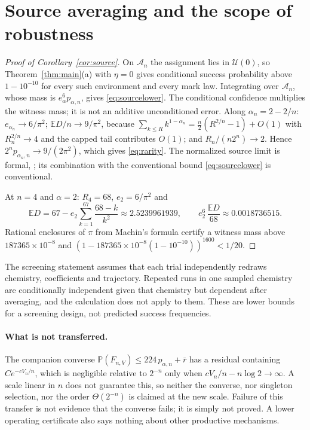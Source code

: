 \documentclass[11pt,letterpaper]{article}
\theoremstyle{plain}
\theoremstyle{definition}
\theoremstyle{remark}
\numberwithin{equation}{section}
\newcommand{\PP}{\mathbb P}
\newcommand{\EE}{\mathbb E}
\newcommand{\cU}{\mathcal U}
\begin{document}
\section{Source averaging and the scope of robustness}\label{sec:source}

\begin{proof}[Proof of Corollary~\ref{cor:source}]
On $\mathcal A_n$ the assignment lies in $\cU(0)$, so Theorem~\ref{thm:main}(a) with $\eta=0$ gives conditional success probability above $1-10^{-10}$ for every such environment and every mark law. Integrating over $\mathcal A_n$, whose mass is $e_\alpha^6p_{\alpha,n}$, gives \eqref{eq:sourcelower}. The conditional confidence multiplies the witness mass; it is not an additive unconditioned error. Along $\alpha_n=2-2/n$: $e_{\alpha_n}\to6/\pi^2$; $\EE D/n\to9/\pi^2$, because $\sum_{k\le R}k^{1-\alpha_n}=\frac n2(R^{2/n}-1)+O(1)$ with $R_n^{2/n}\to4$ and the capped tail contributes $O(1)$; and $R_n/(n2^n)\to2$. Hence $2^np_{\alpha_n,n}\to9/(2\pi^2)$, which gives \eqref{eq:rarity}. The normalized source limit is formal, ; its combination with the conventional bound \eqref{eq:sourcelower} is conventional.

At $n=4$ and $\alpha=2$: $R_4=68$, $e_2=6/\pi^2$ and
\[
 \EE D=67-e_2\sum_{k=1}^{67}\frac{68-k}{k^2}\approx2.5239961939,\qquad e_2^6\,\frac{\EE D}{68}\approx0.0018736515 .
\]
Rational enclosures of $\pi$ from Machin's formula certify a witness mass above $187365\times10^{-8}$ and $(1-187365\times10^{-8}(1-10^{-10}))^{1600}<1/20$.
\end{proof}
The screening statement assumes that each trial independently redraws chemistry, coefficients and trajectory. Repeated runs in one sampled chemistry are conditionally independent given that chemistry but dependent after averaging, and the calculation does not apply to them. These are lower bounds for a screening design, not predicted success frequencies.

\paragraph{What is not transferred.}
The companion converse $\PP(F_{n,V})\le224\,p_{\alpha,n}+\bar r$ \cite{twowindow2026} has a residual containing $Ce^{-cV_n/n}$, which is negligible relative to $2^{-n}$ only when $cV_n/n-n\log2\to\infty$. A scale linear in $n$ does not guarantee this, so neither the converse, nor singleton selection, nor the order $\Theta(2^{-n})$ is claimed at the new scale. Failure of this transfer is not evidence that the converse fails; it is simply not proved. A lower operating certificate also says nothing about other productive mechanisms.
\end{document}
